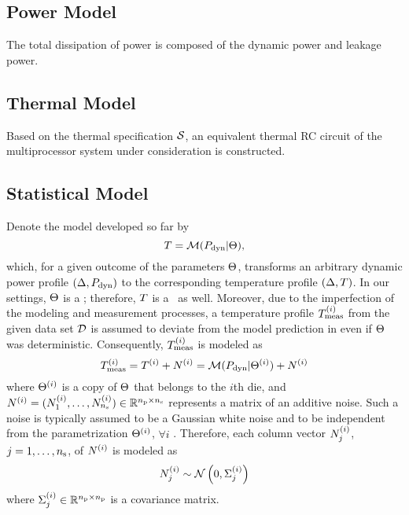\subsection{Power Model}
The total dissipation of power is composed of the dynamic power and leakage power.

\subsection{Thermal Model}
Based on the thermal specification $\mathcal{S}$, an equivalent thermal RC circuit of the multiprocessor system under consideration is constructed.

\subsection{Statistical Model}
Denote the model developed so far by
\begin{equation} \elabel{model}
  \mT = \model{\mP_\dyn | \vU},
\end{equation}
which, for a given outcome of the parameters $\Theta$, transforms an arbitrary dynamic power profile $\left(\Delta, P_{\text{dyn}}\right)$ to the corresponding temperature profile $\profileT$. In our settings, $\Theta$ is a \rv; therefore, $T$ is a \rv\ as well. Moreover, due to the imperfection of the modeling and measurement processes, a temperature profile $T^{(i)}_{\text{meas}}$ from the given data set $\mathcal{D}$ is assumed to deviate from the model prediction in  even if $\Theta$ was deterministic. Consequently, $T^{(i)}_{\text{meas}}$ is modeled as
\[
  T^{(i)}_{\text{meas}} = T^{(i)} + N^{(i)} = \mathcal{M}( P_{\text{dyn}} | \Theta^{(i)} ) + N^{(i)}
\]
where $\Theta^{(i)}$ is a copy of $\Theta$ that belongs to the $i$th die, and $N^{(i)} = ( N^{(i)}_1, \dotsc, N^{(i)}_{n_\text{s}} ) \in \mathbb{R}^{{n_\text{p}} \times n_\text{s}}$ represents a matrix of an additive noise. Such a noise is typically assumed to be a Gaussian white noise and to be independent from the parametrization $\Theta^{(i)}$, $\forall i$ \cite{marzouk2007, el-moselhy2012}. Therefore, each column vector $N^{(i)}_j$, $j = 1, \dotsc, n_\text{s}$, of $N^{(i)}$ is modeled as
\[
  N^{(i)}_j \sim \mathcal{N}\left(0, \Sigma^{(i)}_j\right)
\]
where $\Sigma^{(i)}_j \in \mathbb{R}^{{n_\text{p}} \times {n_\text{p}}}$ is a covariance matrix.
